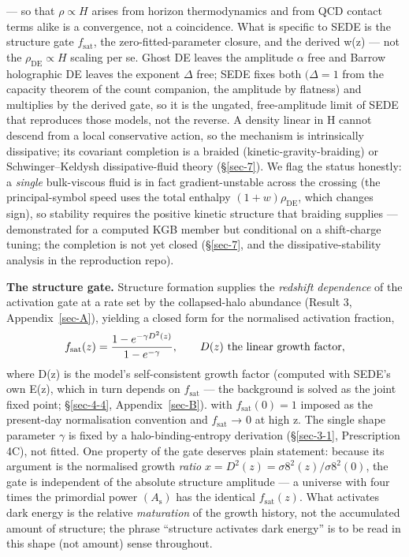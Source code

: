 \documentclass[preprint,12pt]{elsarticle}
\begin{document}
--- so that \(\rho  \propto  H\) arises from horizon thermodynamics and
from QCD contact terms alike is a convergence, not a coincidence. What
is specific to SEDE is the structure gate \(f_{\mathrm{sat}}\), the
zero-fitted-parameter closure, and the derived w(z) --- not the
\(\rho _\mathrm{DE} \propto  H\) scaling per se. Ghost DE leaves the
amplitude \(\alpha\) free and Barrow holographic DE leaves the exponent
\(\Delta\) free; SEDE fixes both \((\Delta  = 1\) from the capacity
theorem of the count companion, the amplitude by flatness) and
multiplies by the derived gate, so it is the ungated, free-amplitude
limit of SEDE that reproduces those models, not the reverse. A density
linear in H cannot descend from a local conservative action, so the
mechanism is intrinsically dissipative; its covariant completion is a
braided (kinetic-gravity-braiding) or Schwinger--Keldysh
dissipative-fluid theory (§\ref{sec-7}). We flag the status honestly: a
\emph{single} bulk-viscous fluid is in fact gradient-unstable across the
crossing (the principal-symbol speed uses the total enthalpy
\((1+w)\rho _\mathrm{DE}\), which changes sign), so stability requires
the positive kinetic structure that braiding supplies --- demonstrated
for a computed KGB member but conditional on a shift-charge tuning; the
completion is not yet closed (§\ref{sec-7}, and the
dissipative-stability analysis in the reproduction repo).

\textbf{The structure gate.} Structure formation supplies the
\emph{redshift dependence} of the activation gate at a rate set by the
collapsed-halo abundance (Result 3, Appendix~\ref{sec-A}), yielding a
closed form for the normalised activation fraction,
\begin{equation}f_{\rm sat}(z) = \frac{1 - e^{-\gamma D^2(z)}}{1 - e^{-\gamma}}, \qquad D(z)\ \text{the linear growth factor},\end{equation}
where D(z) is the model's self-consistent growth factor (computed with
SEDE's own E(z), which in turn depends on \(f_{\mathrm{sat}}\) --- the
background is solved as the joint fixed point; §\ref{sec-4-4},
Appendix~\ref{sec-B}). with \(f_{\mathrm{sat}}(0) = 1\) imposed as the
present-day normalisation convention and \(f_{\mathrm{sat}}\) → 0 at
high z. The single shape parameter \(\gamma\) is fixed by a
halo-binding-entropy derivation (§\ref{sec-3-1}, Prescription 4C), not
fitted. One property of the gate deserves plain statement: because its
argument is the normalised growth \emph{ratio}
\(x = D^{2}(z) = \sigma 8^{2}(z)/\sigma 8^{2}(0)\), the gate is
independent of the absolute structure amplitude --- a universe with four
times the primordial power \((A_{\mathrm{s}})\) has the identical
\(f_{\mathrm{sat}}(z)\). What activates dark energy is the relative
\emph{maturation} of the growth history, not the accumulated amount of
structure; the phrase ``structure activates dark energy'' is to be read
in this shape (not amount) sense throughout.
\end{document}
